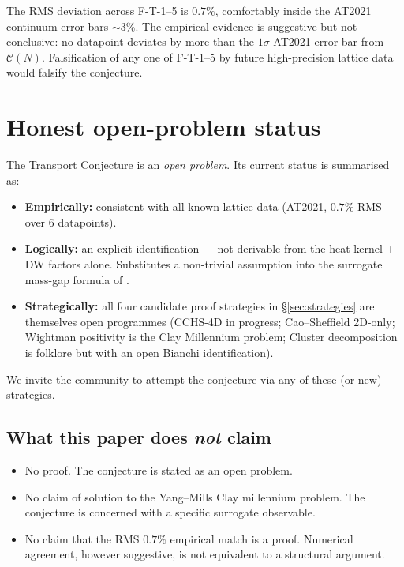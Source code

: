 \documentclass[11pt,a4paper,reqno]{amsart}
\theoremstyle{definition}
\begin{document}
\noindent
The RMS deviation across F-T-1--5 is $0.7\%$, comfortably inside the AT2021 continuum error bars $\sim 3\%$. The empirical evidence is suggestive but not conclusive: no datapoint deviates by more than the $1\sigma$ AT2021 error bar from $\mathcal{C}(N)$. Falsification of any one of F-T-1--5 by future high-precision lattice data would falsify the conjecture.

\section{Honest open-problem status}\label{sec:status}

The Transport Conjecture is an \emph{open problem}. Its current status is summarised as:
\begin{itemize}
   \item \textbf{Empirically:} consistent with all known lattice data (AT2021, $0.7\%$ RMS over 6 datapoints).
   \item \textbf{Logically:} an explicit identification --- not derivable from the heat-kernel + DW factors alone. Substitutes a non-trivial assumption into the surrogate mass-gap formula of \cite{Remondiere2026RouteB}.
   \item \textbf{Strategically:} all four candidate proof strategies in \S\ref{sec:strategies} are themselves open programmes (CCHS-4D in progress; Cao--Sheffield 2D-only; Wightman positivity is the Clay Millennium problem; Cluster decomposition is folklore but with an open Bianchi identification).
\end{itemize}

We invite the community to attempt the conjecture via any of these (or new) strategies.

\subsection{What this paper does \emph{not} claim}\label{ss:not-claim}

\begin{itemize}
   \item No proof. The conjecture is stated as an open problem.
   \item No claim of solution to the Yang--Mills Clay millennium problem. The conjecture is concerned with a specific surrogate observable.
   \item No claim that the RMS $0.7\%$ empirical match is a proof. Numerical agreement, however suggestive, is not equivalent to a structural argument.
\end{itemize}
\end{document}
